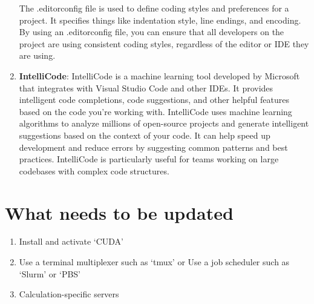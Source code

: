 \documentclass[10pt, a4paper]{article}
\begin{document}
\begin{enumerate}
    The .editorconfig file is used to define coding styles and preferences for a project. It specifies things like indentation style, line endings, and encoding. By using an .editorconfig file, you can ensure that all developers on the project are using consistent coding styles, regardless of the editor or IDE they are using.
    \item \textbf{IntelliCode}:
    IntelliCode is a machine learning tool developed by Microsoft that integrates with Visual Studio Code and other IDEs. It provides intelligent code completions, code suggestions, and other helpful features based on the code you're working with. IntelliCode uses machine learning algorithms to analyze millions of open-source projects and generate intelligent suggestions based on the context of your code. It can help speed up development and reduce errors by suggesting common patterns and best practices. IntelliCode is particularly useful for teams working on large codebases with complex code structures.
\end{enumerate}

\section*{What needs to be updated}
\begin{enumerate}
    \item Install and activate `CUDA'
    \item Use a terminal multiplexer such as `tmux' or Use a job scheduler such as `Slurm' or `PBS'
    \item Calculation-specific servers
\end{enumerate}
\end{document}

